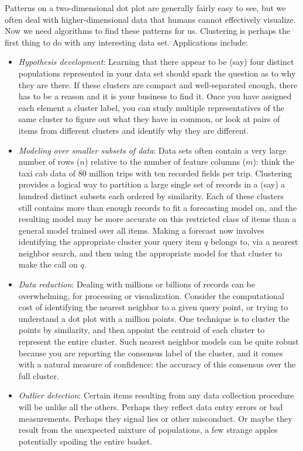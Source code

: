 \documentclass[10pt]{article}
\begin{document}
Patterns on a two-dimensional dot plot are generally fairly easy to see, but we often deal with higher-dimensional data that humans cannot effectively visualize. Now we need algorithms to find these patterns for us. Clustering is perhaps the first thing to do with any interesting data set. Applications include:
\begin{itemize}
  \item \textit{Hypothesis development}: Learning that there appear to be (say) four distinct populations represented in your data set should spark the question as to why they are there. If these clusters are compact and well-separated enough, there has to be a reason and it is your business to find it. Once you have assigned each element a cluster label, you can study multiple representatives of the same cluster to figure out what they have in common, or look at pairs of items from different clusters and identify why they are different.
  \item \textit{Modeling over smaller subsets of data}: Data sets often contain a very large number of rows ($n$) relative to the number of feature columns ($m$): think the taxi cab data of 80 million trips with ten recorded fields per trip. Clustering provides a logical way to partition a large single set of records in a (say) a hundred distinct subsets each ordered by similarity. Each of these clusters still contains more than enough records to fit a forecasting model on, and the resulting model may be more accurate on this restricted class of items than a general model trained over all items. Making a forecast now involves identifying the appropriate cluster your query item $q$ belongs to, via a nearest neighbor search, and then using the appropriate model for that cluster to make the call on $q$.
  \item \textit{Data reduction}: Dealing with millions or billions of records can be overwhelming, for processing or visualization. Consider the computational cost of identifying the nearest neighbor to a given query point, or trying to understand a dot plot with a million points. One technique is to cluster the points by similarity, and then appoint the centroid of each cluster to represent the entire cluster. Such nearest neighbor models can be quite robust because you are reporting the consensus label of the cluster, and it comes with a natural measure of confidence: the accuracy of this consensus over the full cluster.
  \item \textit{Outlier detection}: Certain items resulting from any data collection procedure will be unlike all the others. Perhaps they reflect data entry errors or bad measurements. Perhaps they signal lies or other misconduct. Or maybe they result from the unexpected mixture of populations, a few strange apples potentially spoiling the entire basket.
\end{itemize}
\end{document}
